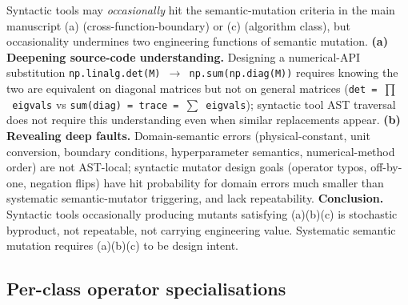 \documentclass[manuscript,screen,review]{acmart}
\begin{document}
Syntactic tools may \emph{occasionally} hit the semantic-mutation criteria in the main manuscript (a)
(cross-function-boundary) or (c) (algorithm class), but occasionality
undermines two engineering functions of semantic mutation. \textbf{(a)
Deepening source-code understanding.} Designing a numerical-API substitution
\texttt{np.linalg.det(M)\ $\to$\ np.sum(np.diag(M))} requires knowing the
two are equivalent on diagonal matrices but not on general matrices
(\texttt{det\ =\ $\prod$\ eigvals} vs
\texttt{sum(diag)\ =\ trace\ =\ $\sum$\ eigvals}); syntactic tool AST
traversal does not require this understanding even when similar
replacements appear. \textbf{(b) Revealing deep faults.}
Domain-semantic errors (physical-constant, unit conversion, boundary
conditions, hyperparameter semantics, numerical-method order) are not
AST-local; syntactic mutator design goals (operator typos, off-by-one,
negation flips) have hit probability for domain errors much smaller than
systematic semantic-mutator triggering, and lack repeatability.
\textbf{Conclusion.} Syntactic tools occasionally producing mutants
satisfying (a)(b)(c) is stochastic byproduct, not repeatable, not
carrying engineering value. Systematic semantic mutation requires
(a)(b)(c) to be design intent.

\subsection{Per-class operator specialisations}\label{b.2-per-class-operator-specialisations}
\end{document}
